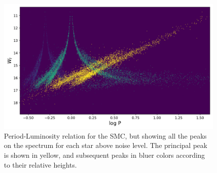 \begin{figure}
	\centering
	\includegraphics[width=\textwidth]{img/smc.png}
	\caption[PL relation with secondary peaks for the SMC]{
		Period-Luminosity relation for the SMC, but showing all the peaks on the spectrum for each star above noise level. 
		The principal peak is shown in yellow, and subsequent peaks in bluer colors according to their relative heights.
	}
	\label{fig:color-pl-smc}
\end{figure}
